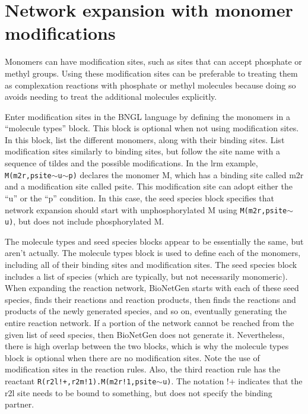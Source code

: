 \documentclass {scrbook}
\newcommand {\ttt} {\texttt}
\begin{document}
\section{Network expansion with monomer modifications}

Monomers can have modification sites, such as sites that can accept phosphate or methyl groups. Using these modification sites can be preferable to treating them as complexation reactions with phosphate or methyl molecules because doing so avoids needing to treat the additional molecules explicitly.

Enter modification sites in the BNGL language by defining the monomers in a ``molecule types'' block. This block is optional when not using modification sites. In this block, list the different monomers, along with their binding sites. List modification sites similarly to binding sites, but follow the site name with a sequence of tildes and the possible modifications. In the lrm example, \ttt{M(m2r,psite$\sim$u$\sim$p)} declares the monomer M, which has a binding site called m2r and a modification site called psite. This modification site can adopt either the ``u'' or the ``p'' condition. In this case, the seed species block specifies that network expansion should start with unphosphorylated M using \ttt{M(m2r,psite$\sim$u)}, but does not include phosphorylated M.

The molecule types and seed species blocks appear to be essentially the same, but aren't actually. The molecule types block is used to define each of the monomers, including all of their binding sites and modification sites. The seed species block includes a list of species (which are typically, but not necessarily monomeric). When expanding the reaction network, BioNetGen starts with each of these seed species, finds their reactions and reaction products, then finds the reactions and products of the newly generated species, and so on, eventually generating the entire reaction network. If a portion of the network cannot be reached from the given list of seed species, then BioNetGen does not generate it. Nevertheless, there is high overlap between the two blocks, which is why the molecule types block is optional when there are no modification sites.
Note the use of modification sites in the reaction rules. Also, the third reaction rule has the reactant \ttt{R(r2l!+,r2m!1).M(m2r!1,psite$\sim$u)}. The notation !+ indicates that the r2l site needs to be bound to something, but does not specify the binding partner.
\end{document}
